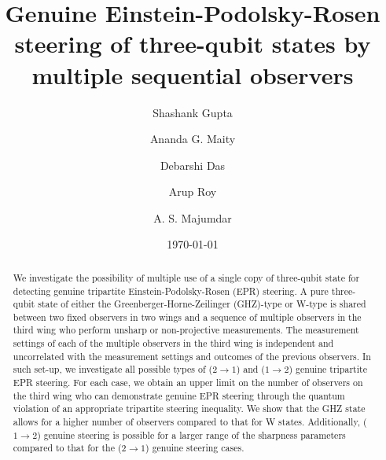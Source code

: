 \documentclass[pra,a4paper,aps,twocolumn,showpacs,superscriptaddress,groupedaddress]{revtex4}
\begin{document}
	\title{Genuine Einstein-Podolsky-Rosen steering of three-qubit states by multiple sequential observers}
	
\author{Shashank Gupta}

\author{Ananda G. Maity}

\author{Debarshi Das}

\author{Arup Roy}

\author{A. S. Majumdar}

\date{\today}

\begin{abstract}
We investigate the possibility of multiple use of a single copy of three-qubit state for detecting genuine tripartite Einstein-Podolsky-Rosen (EPR) steering. A pure three-qubit state of either the Greenberger-Horne-Zeilinger (GHZ)-type or W-type is shared between two fixed observers in two wings and a sequence of multiple observers in the third wing who perform unsharp or non-projective measurements. The measurement settings of each of the multiple observers in the third wing is independent and uncorrelated with the measurement settings and outcomes of the previous observers. In such set-up, we investigate all possible types of ($2\rightarrow1$) and ($1\rightarrow2$) genuine tripartite EPR steering. For each case, we obtain an upper limit on the number of observers on the third wing who can demonstrate genuine EPR steering through the quantum violation of an appropriate tripartite steering inequality. We show that the GHZ state allows for a higher number of observers compared to that for W states.  Additionally, ($1\rightarrow 2$) genuine steering is possible for a larger range of the sharpness parameters compared to that for the ($2 \rightarrow 1$) genuine steering cases. 

\end{abstract}
\end{document}
